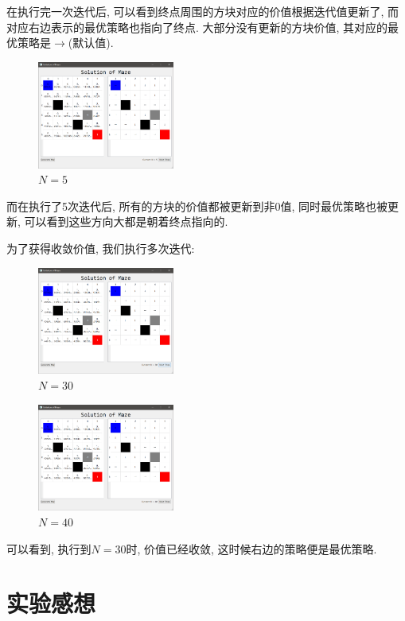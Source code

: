 \documentclass{acm_proc_article-sp}
\begin{document}
在执行完一次迭代后, 可以看到终点周围的方块对应的价值根据迭代值更新了, 而对应右边表示的最优策略也指向了终点. 
大部分没有更新的方块价值, 其对应的最优策略是$\rightarrow$(默认值).
\begin{figure}[H]
    \centering
    \caption{$N=5$}
    \includegraphics[width=0.4\textwidth]{figure3.png}
\end{figure}

而在执行了5次迭代后, 所有的方块的价值都被更新到非0值, 同时最优策略也被更新, 可以看到这些方向大都是朝着终点指向的.

为了获得收敛价值, 我们执行多次迭代:

\begin{figure}[H]
    \centering
    \caption{$N=30$}
    \includegraphics[width=0.4\textwidth]{figure4.png}
\end{figure}
\begin{figure}[H]
    \centering
    \caption{$N=40$}
    \includegraphics[width=0.4\textwidth]{figure5.png}
\end{figure}

可以看到, 执行到$N = 30$时, 价值已经收敛, 这时候右边的策略便是最优策略.

\section{实验感想}
\end{document}
